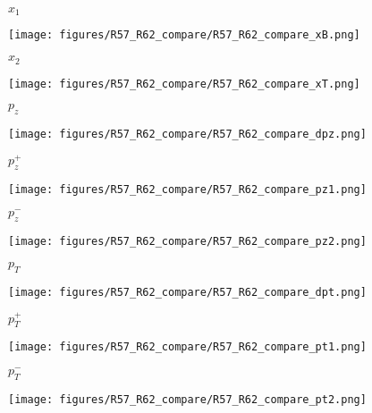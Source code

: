 \documentclass{beamer}
\begin{document}
\begin{frame}{$x_1$}
	\begin{center}
		\texttt{[image: figures/R57\_R62\_compare/R57\_R62\_compare\_xB.png]}
	\end{center}
\end{frame}

\begin{frame}{$x_2$}
	\begin{center}
		\texttt{[image: figures/R57\_R62\_compare/R57\_R62\_compare\_xT.png]}
	\end{center}
\end{frame}

\begin{frame}{$p_z$}
	\begin{center}
		\texttt{[image: figures/R57\_R62\_compare/R57\_R62\_compare\_dpz.png]}
	\end{center}
\end{frame}

\begin{frame}{$p_z^+$}
	\begin{center}
		\texttt{[image: figures/R57\_R62\_compare/R57\_R62\_compare\_pz1.png]}
	\end{center}
\end{frame}

\begin{frame}{$p_z^-$}
	\begin{center}
		\texttt{[image: figures/R57\_R62\_compare/R57\_R62\_compare\_pz2.png]}
	\end{center}
\end{frame}

\begin{frame}{$p_T$}
	\begin{center}
		\texttt{[image: figures/R57\_R62\_compare/R57\_R62\_compare\_dpt.png]}
	\end{center}
\end{frame}

\begin{frame}{$p_T^+$}
	\begin{center}
		\texttt{[image: figures/R57\_R62\_compare/R57\_R62\_compare\_pt1.png]}
	\end{center}
\end{frame}

\begin{frame}{$p_T^-$}
	\begin{center}
		\texttt{[image: figures/R57\_R62\_compare/R57\_R62\_compare\_pt2.png]}
	\end{center}
\end{frame}
\end{document}
